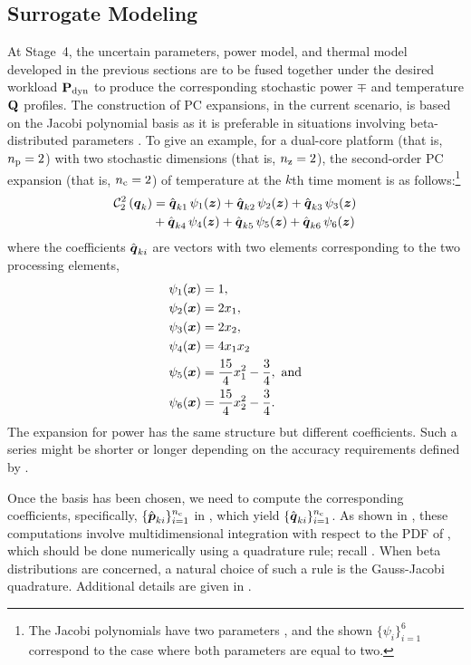 \subsection{Surrogate Modeling}

At Stage~4, the uncertain parameters, power model, and thermal model developed
in the previous sections are to be fused together under the desired workload
$\mathbf{P}_{\mathrm{dyn}}$ to produce the corresponding stochastic power $\mp$ and
temperature $\mathbf{Q}$ profiles. The construction of PC expansions, in the current
scenario, is based on the Jacobi polynomial basis as it is preferable in
situations involving beta-distributed parameters \cite{xiu2010}. To give an
example, for a dual-core platform (that is, ${n_\mathrm{p}} = 2$) with two stochastic
dimensions (that is, ${n_\mathrm{z}} = 2$), the second-order PC expansion (that is, ${n_\mathrm{c}} =
2$) of temperature at the $k$th time moment is as follows:\footnote{The Jacobi
polynomials have two parameters \cite{xiu2010}, and the shown $\{ \psi_i \}_{i =
1}^6$ correspond to the case where both parameters are equal to two.}
\begin{align}
  \chaos{2}{2}{\vq_k}
  & = \hat{\vq}_{k1} \, \psi_1(\vz) + \hat{\vq}_{k2} \, \psi_2(\vz) + \hat{\vq}_{k3} \, \psi_3(\vz) \nonumber \\
  & {} + \hat{\vq}_{k4} \, \psi_4(\vz) + \hat{\vq}_{k5} \, \psi_5(\vz) + \hat{\vq}_{k6} \, \psi_6(\vz) \elab{pc-example}
\end{align}
where the coefficients $\hat{\boldsymbol{q}}_{ki}$ are vectors with two elements
corresponding to the two processing elements,
\begin{align*}
  & \psi_1(\boldsymbol{x}) = 1, \\
  & \psi_2(\boldsymbol{x}) = 2 x_1, \\
  & \psi_3(\boldsymbol{x}) = 2 x_2, \\
  & \psi_4(\boldsymbol{x}) = 4 x_1 x_2 \\
  & \psi_5(\boldsymbol{x}) = \frac{15}{4} x_1^2 - \frac{3}{4}, \text{ and} \\
  & \psi_6(\boldsymbol{x}) = \frac{15}{4} x_2^2 - \frac{3}{4}.
\end{align*}
The expansion for power has the same structure but different coefficients. Such
a series might be shorter or longer depending on the accuracy requirements
defined by \lc.

Once the basis has been chosen, we need to compute the corresponding
coefficients, specifically, $\{ \hat{\boldsymbol{p}}_{ki} \}_{i = 1}^{n_\mathrm{c}}$ in
, which yield $\{ \hat{\boldsymbol{q}}_{ki} \}_{i = 1}^{n_\mathrm{c}}$. As shown in
, these computations involve multidimensional integration
with respect to the PDF of \vz, which should be done numerically using a
quadrature rule; recall . When beta distributions are
concerned, a natural choice of such a rule is the Gauss-Jacobi quadrature.
Additional details are given in .

